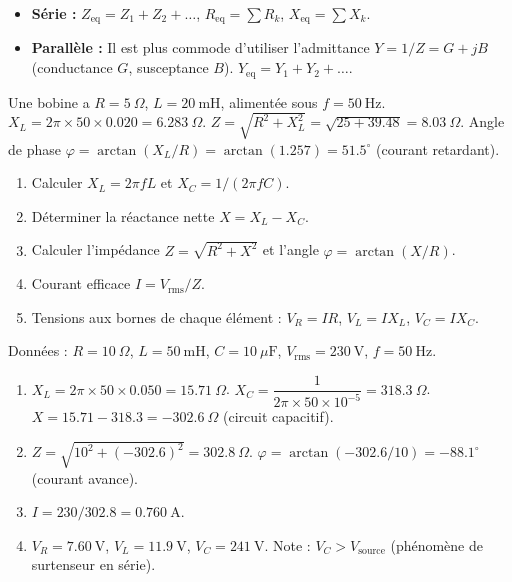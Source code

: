 \documentclass[11pt]{article}
\newcommand{\cle}[1]{{\popxbold\color{popdark}#1}}
\begin{document}
\begin{propriete}
\begin{itemize}
\item \textbf{Série :} $Z_{\mathrm{eq}} = Z_1 + Z_2 + \dots$, $R_{\mathrm{eq}} = \sum R_k$, $X_{\mathrm{eq}} = \sum X_k$.
\item \textbf{Parallèle :} Il est plus commode d'utiliser l'\cle{admittance} $Y = 1/Z = G + jB$ (conductance $G$, susceptance $B$). $Y_{\mathrm{eq}} = Y_1 + Y_2 + \dots$.
\end{itemize}
\end{propriete}

\begin{exemplebox}
Une bobine a $R = 5\ \Omega$, $L = 20\ \mathrm{mH}$, alimentée sous $f = 50\ \mathrm{Hz}$.
$X_L = 2\pi \times 50 \times 0.020 = 6.283\ \Omega$.
$Z = \sqrt{R^2 + X_L^2} = \sqrt{25 + 39.48} = 8.03\ \Omega$.
Angle de phase $\varphi = \arctan(X_L/R) = \arctan(1.257) = 51.5^\circ$ (courant retardant).
\end{exemplebox}

\begin{methode}
\begin{enumerate}
\item Calculer $X_L = 2\pi f L$ et $X_C = 1/(2\pi f C)$.
\item Déterminer la réactance nette $X = X_L - X_C$.
\item Calculer l'impédance $Z = \sqrt{R^2 + X^2}$ et l'angle $\varphi = \arctan(X/R)$.
\item Courant efficace $I = V_{\mathrm{rms}}/Z$.
\item Tensions aux bornes de chaque élément : $V_R = IR$, $V_L = IX_L$, $V_C = IX_C$.
\end{enumerate}
\end{methode}

\begin{exoresolu}
Données : $R = 10\ \Omega$, $L = 50\ \mathrm{mH}$, $C = 10\ \mu\mathrm{F}$, $V_{\mathrm{rms}} = 230\ \mathrm{V}$, $f = 50\ \mathrm{Hz}$.
\begin{enumerate}
\item $X_L = 2\pi \times 50 \times 0.050 = 15.71\ \Omega$.
$X_C = \dfrac{1}{2\pi \times 50 \times 10^{-5}} = 318.3\ \Omega$.
$X = 15.71 - 318.3 = -302.6\ \Omega$ (circuit capacitif).
\item $Z = \sqrt{10^2 + (-302.6)^2} = 302.8\ \Omega$.
$\varphi = \arctan(-302.6/10) = -88.1^\circ$ (courant avance).
\item $I = 230 / 302.8 = 0.760\ \mathrm{A}$.
\item $V_R = 7.60\ \mathrm{V}$, $V_L = 11.9\ \mathrm{V}$, $V_C = 241\ \mathrm{V}$.
Note : $V_C > V_{\mathrm{source}}$ (phénomène de surtenseur en série).
\end{enumerate}
\end{exoresolu}
\end{document}
